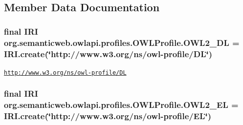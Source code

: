 \subsection{Member Data Documentation}
\hypertarget{interfaceorg_1_1semanticweb_1_1owlapi_1_1profiles_1_1_o_w_l_profile_a8b11c12838a73dafacbed5a990556e96}{
\subsubsection[{O\-W\-L2\-\_\-\-D\-L}]{\setlength{\rightskip}{0pt plus 5cm}final {\bf I\-R\-I} org.\-semanticweb.\-owlapi.\-profiles.\-O\-W\-L\-Profile.\-O\-W\-L2\-\_\-\-D\-L = {\bf I\-R\-I.\-create}(\char`\"{}http\-://www.\-w3.\-org/ns/owl-\/profile/D\-L\char`\"{})\hspace{0.3cm}{\ttfamily [static]}}}\label{interfaceorg_1_1semanticweb_1_1owlapi_1_1profiles_1_1_o_w_l_profile_a8b11c12838a73dafacbed5a990556e96}
\href{http://www.w3.org/ns/owl-profile/DL}{\tt http\-://www.\-w3.\-org/ns/owl-\/profile/\-D\-L} \hypertarget{interfaceorg_1_1semanticweb_1_1owlapi_1_1profiles_1_1_o_w_l_profile_add82ed6f03a718a795c66c9e04b282be}{
\subsubsection[{O\-W\-L2\-\_\-\-E\-L}]{\setlength{\rightskip}{0pt plus 5cm}final {\bf I\-R\-I} org.\-semanticweb.\-owlapi.\-profiles.\-O\-W\-L\-Profile.\-O\-W\-L2\-\_\-\-E\-L = {\bf I\-R\-I.\-create}(\char`\"{}http\-://www.\-w3.\-org/ns/owl-\/profile/E\-L\char`\"{})\hspace{0.3cm}{\ttfamily [static]}}}\label{interfaceorg_1_1semanticweb_1_1owlapi_1_1profiles_1_1_o_w_l_profile_add82ed6f03a718a795c66c9e04b282be}
